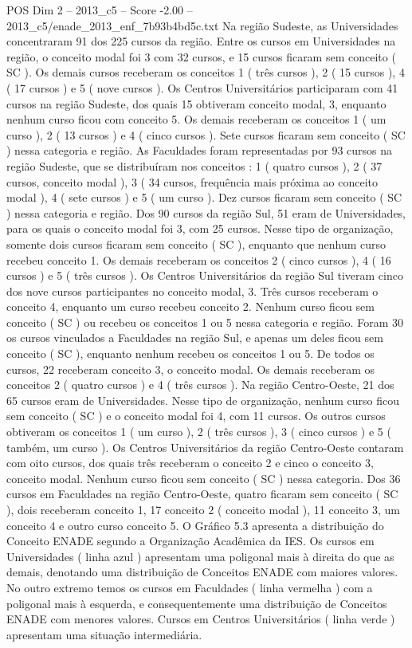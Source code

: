 \begin{textsample}{POS Dim 2 – 2013\_c5 – Score -2.00 – 2013\_c5/enade\_2013\_enf\_7b93b4bd5c.txt}
Na região Sudeste, as Universidades concentraram 91 dos 225 cursos da região.
Entre os cursos em Universidades na região, o conceito modal foi 3 com 32 cursos, e 15 cursos ficaram sem conceito ( SC ).
Os demais cursos receberam os conceitos 1 ( três cursos ), 2 ( 15 cursos ), 4 ( 17 cursos ) e 5 ( nove cursos ).
Os Centros Universitários participaram com 41 cursos na região Sudeste, dos quais 15 obtiveram conceito modal, 3, enquanto nenhum curso ficou com conceito 5.
Os demais receberam os conceitos 1 ( um curso ), 2 ( 13 cursos ) e 4 ( cinco cursos ).
Sete cursos ficaram sem conceito ( SC ) nessa categoria e região.
As Faculdades foram representadas por 93 cursos na região Sudeste, que se distribuíram nos conceitos : 1 ( quatro cursos ), 2 ( 37 cursos, conceito modal ), 3 ( 34 cursos, frequência mais próxima ao conceito modal ), 4 ( sete cursos ) e 5 ( um curso ).
Dez cursos ficaram sem conceito ( SC ) nessa categoria e região.
Dos 90 cursos da região Sul, 51 eram de Universidades, para os quais o conceito modal foi 3, com 25 cursos.
Nesse tipo de organização, somente dois cursos ficaram sem conceito ( SC ), enquanto que nenhum curso recebeu conceito 1.
Os demais receberam os conceitos 2 ( cinco cursos ), 4 ( 16 cursos ) e 5 ( três cursos ).
Os Centros Universitários da região Sul tiveram cinco dos nove cursos participantes no conceito modal, 3.
Três cursos receberam o conceito 4, enquanto um curso recebeu conceito 2.
Nenhum curso ficou sem conceito ( SC ) ou recebeu os conceitos 1 ou 5 nessa categoria e região.
Foram 30 os cursos vinculados a Faculdades na região Sul, e apenas um deles ficou sem conceito ( SC ), enquanto nenhum recebeu os conceitos 1 ou 5.
De todos os cursos, 22 receberam conceito 3, o conceito modal.
Os demais receberam os conceitos 2 ( quatro cursos ) e 4 ( três cursos ).
Na região Centro-Oeste, 21 dos 65 cursos eram de Universidades.
Nesse tipo de organização, nenhum curso ficou sem conceito ( SC ) e o conceito modal foi 4, com 11 cursos.
Os outros cursos obtiveram os conceitos 1 ( um curso ), 2 ( três cursos ), 3 ( cinco cursos ) e 5 ( também, um curso ).
Os Centros Universitários da região Centro-Oeste contaram com oito cursos, dos quais três receberam o conceito 2 e cinco o conceito 3, conceito modal.
Nenhum curso ficou sem conceito ( SC ) nessa categoria.
Dos 36 cursos em Faculdades na região Centro-Oeste, quatro ficaram sem conceito ( SC ), dois receberam conceito 1, 17 conceito 2 ( conceito modal ), 11 conceito 3, um conceito 4 e outro curso conceito 5.
O Gráfico 5.3 apresenta a distribuição do Conceito ENADE segundo a Organização Acadêmica da IES.
Os cursos em Universidades ( linha azul ) apresentam uma poligonal mais à direita do que as demais, denotando uma distribuição de Conceitos ENADE com maiores valores.
No outro extremo temos os cursos em Faculdades ( linha vermelha ) com a poligonal mais à esquerda, e consequentemente uma distribuição de Conceitos ENADE com menores valores.
Cursos em Centros Universitários ( linha verde ) apresentam uma situação intermediária.

\end{textsample}
